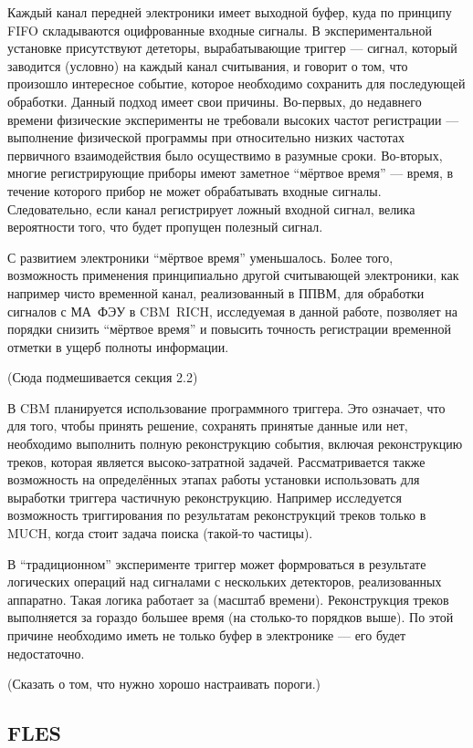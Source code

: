 Каждый канал передней электроники имеет выходной буфер, куда по принципу FIFO складываются оцифрованные входные сигналы. В экспериментальной установке присутствуют дететоры, вырабатывающие триггер --- сигнал, который заводится (условно) на каждый канал считывания, и говорит о том, что произошло интересное событие, которое необходимо сохранить для последующей обработки. Данный подход имеет свои причины. Во-первых, до недавнего времени физические эксперименты не требовали высоких частот регистрации --- выполнение физической программы при относительно низких частотах первичного взаимодействия было осуществимо в разумные сроки. Во-вторых, многие регистрирующие приборы имеют заметное ``мёртвое время'' --- время, в течение которого прибор не может обрабатывать входные сигналы. Следовательно, если канал регистрирует ложный входной сигнал, велика вероятности того, что будет пропущен полезный сигнал.

С развитием электроники ``мёртвое время'' уменьшалось. Более того, возможность применения принципиально другой считывающей электроники, как например чисто временной канал, реализованный в ППВМ, для обработки сигналов с МА~ФЭУ в CBM~RICH, исследуемая в данной работе, позволяет на порядки снизить ``мёртвое время'' и повысить точность регистрации временной отметки в ущерб полноты информации.

(Сюда подмешивается секция 2.2)

В CBM планируется использование программного триггера. Это означает, что для того, чтобы принять решение, сохранять принятые данные или нет, необходимо выполнить полную реконструкцию события, включая реконструкцию треков, которая является высоко-затратной задачей. Рассматривается также возможность на определённых этапах работы установки использовать для выработки триггера частичную реконструкцию. Например исследуется возможность триггирования по результатам реконструкций треков только в MUCH, когда стоит задача поиска (такой-то частицы).

В ``традиционном'' эксперименте триггер может формроваться в результате логических операций над сигналами с нескольких детекторов, реализованных аппаратно. Такая логика работает за (масштаб времени). Реконструкция треков выполняется за гораздо большее время (на столько-то порядков выше). По этой причине необходимо иметь не только буфер в электронике --- его будет недостаточно. 

(Сказать о том, что нужно хорошо настраивать пороги.)

\subsection{FLES}\label{sec:secFLES}

